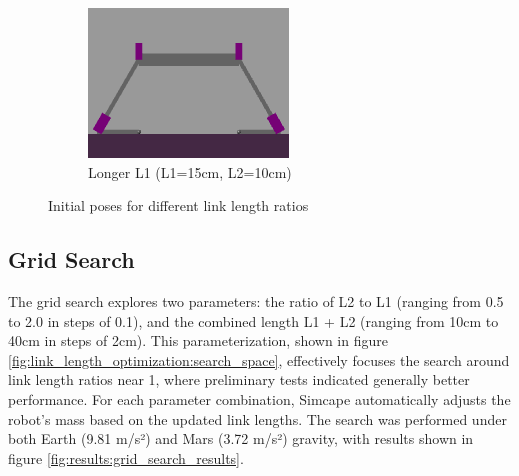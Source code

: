 \begin{figure}[h]
\begin{subfigure}[b]{0.32\textwidth}
        \centering
        \includegraphics[width=\textwidth]{Images/link_length_optimization/longer_L1_pose.png}
        \caption{Longer L1 (L1=15cm, L2=10cm)}
    \end{subfigure}
    \caption{Initial poses for different link length ratios}
    \label{fig:link_length_optimization:initial_poses}
\end{figure}



\subsection{Grid Search}
The grid search explores two parameters: the ratio of L2 to L1 (ranging from 0.5 to 2.0 in steps of 0.1), and the combined length L1 + L2 (ranging from 10cm to 40cm in steps of 2cm). This parameterization, shown in figure \ref{fig:link_length_optimization:search_space}, effectively focuses the search around link length ratios near 1, where preliminary tests indicated generally better performance. For each parameter combination, Simcape automatically adjusts the robot's mass based on the updated link lengths. The search was performed under both Earth (9.81 m/s²) and Mars (3.72 m/s²) gravity, with results shown in figure \ref{fig:results:grid_search_results}.

